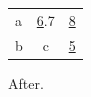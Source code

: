 \documentclass{article}
\begin{document}
\begin{tabular}{lcr}
a & \ul 6.7 & {\ul 8} \\
b & c & \ul 5 \\
\end{tabular}
After.
\end{document}
